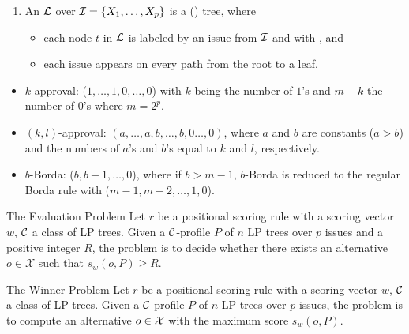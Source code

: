 {
	\begin{enumerate}
		\item An  $\mathcal{L}$ over 
					$\mathcal{I}=\{X_1,\ldots,X_p\}$ is a () tree, where
		\begin{itemize}
			\item each node $t$ in $\mathcal{L}$ is labeled by an issue from $\mathcal{I}$
						and with , and
			\item each issue appears  on every path from the root to a leaf.
		\end{itemize}
	\end{enumerate}
}

{
	\begin{itemize}
		\item $k$-approval: ($1,\ldots,1,0,\ldots,0$) with $k$ being the number
					of $1$'s and $m-k$ the number of $0$'s where $m=2^p$.
		\item $(k,l)$-approval: $(a,\ldots, a, b,\ldots, b, 0\ldots, 0)$,
		      where $a$ and $b$ are constants ($a>b$)
					and the numbers of $a$'s and $b$'s equal to $k$ and $l$,
      		respectively.
		\item $b$-Borda: ($b, b-1, \ldots, 0$), where if $b > m-1$, $b$-Borda is reduced to the regular
							Borda rule with ($m-1, m-2, \ldots, 1, 0$).
	\end{itemize}
}

{
  \begin{block}{The Evaluation Problem}
		Let $r$ be a positional scoring rule with a scoring 
		vector $w$, $\mathcal{C}$ a class of LP trees.
		Given a $\mathcal{C}$-profile $P$ of $n$ LP trees over $p$ issues and a 
		positive integer $R$,
		the  problem is to decide whether 
		there exists an alternative $o \in \mathcal{X}$ such that $s_{{w}}(o,P)
    \geq R$.
  \end{block}

	\vspace{0.5cm}

  \begin{block}{The Winner Problem}
		Let $r$ be a positional scoring rule with a scoring 
		vector $w$, $\mathcal{C}$ a class of LP trees.
		Given a $\mathcal{C}$-profile $P$ of $n$ LP trees over $p$ issues,
		the  problem is to compute an alternative
		$o \in \mathcal{X}$ with the maximum score $s_w(o,P)$.
  \end{block}
}

